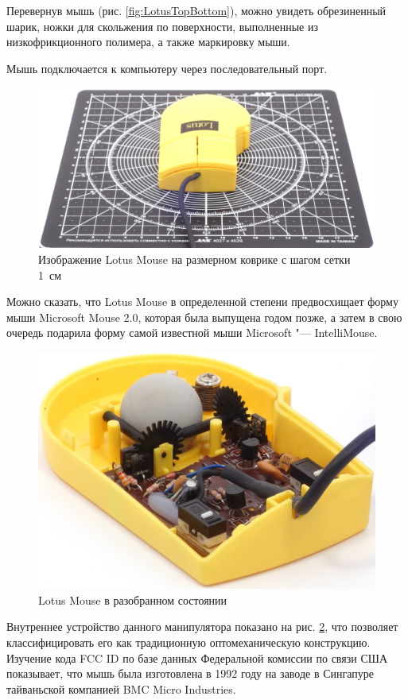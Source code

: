 \documentclass[11pt, a4paper]{article}
\begin{document}
Перевернув мышь (рис. \ref{fig:LotusTopBottom}), можно увидеть обрезиненный шарик, ножки для скольжения по поверхности, выполненные из низкофрикционного полимера, а также маркировку мыши.

Мышь подключается к компьютеру через последовательный порт.

\begin{figure}[h]
    \centering
    \includegraphics[scale=0.3]{1992_lotus_mouse/size_30.jpg}
    \caption{Изображение Lotus Mouse на размерном коврике с шагом сетки 1~см}
    \label{fig:LotusSize}
\end{figure}

Можно сказать, что Lotus Mouse в определенной степени предвосхищает форму мыши Microsoft Mouse 2.0, которая была выпущена годом позже, а затем в свою очередь подарила форму самой известной мыши Microsoft "--- IntelliMouse.

\begin{figure}[h]
    \centering
    \includegraphics[scale=0.7]{1992_lotus_mouse/inside_30.jpg}
    \caption{Lotus Mouse в разобранном состоянии}
    \label{fig:LotusInside}
\end{figure}

Внутреннее устройство данного манипулятора показано на рис. \ref{fig:LotusInside}, что позволяет классифицировать его как традиционную оптомеханическую конструкцию. Изучение кода FCC ID по базе данных Федеральной комиссии по связи США показывает, что мышь была изготовлена в 1992 году на заводе в Сингапуре тайваньской компанией BMC Micro Industries.
\end{document}
